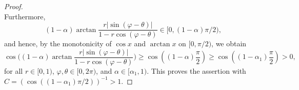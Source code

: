 \documentclass[10pt,a4paper]{amsart}
\begin{document}
\begin{proof}
\begin{equation*}
\end{equation*}
Furthermore,
\begin{equation*}
    (1-\alpha)\arctan\frac{r|\sin(\varphi-\theta)|}{1-r\cos(\varphi-\theta)}\in [0,(1-\alpha)\pi/2),
\end{equation*}
and hence,  by the monotonicity of $\cos x$ and $\arctan x$ on $[0,\pi/2)$, we obtain
\begin{equation*}
\cos{\Big((1-\alpha) \arctan\frac{r|\sin(\varphi-\theta)|}{1-r\cos(\varphi-\theta)}\Big)}\geq \cos\left((1-\alpha)\frac{\pi}{2}\right)\geq \cos\left((1-\alpha_1)\frac{\pi}{2}\right)>0,
\end{equation*}
for all $r\in [0,1)$, $\varphi,\theta\in [0,2\pi)$, and $\alpha\in [\alpha_1,1)$. This proves the assertion with $C=(\cos((1-\alpha_1)\pi/2))^{-1}>1$.
\end{proof}
\end{document}
